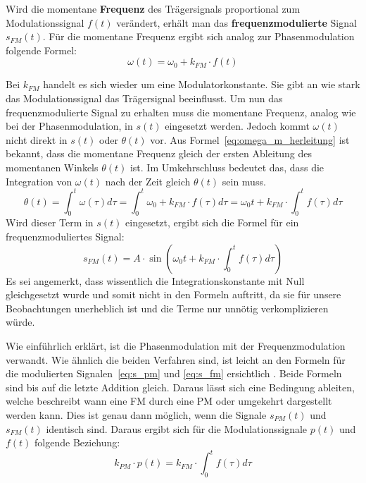 Wird die momentane \textbf{Frequenz} des Trägersignals proportional zum Modulationssignal \(f(t)\) verändert, erhält man das \textbf{frequenzmodulierte} Signal \(s_{FM}(t)\). \cite[S. 210]{lathi} Für die momentane Frequenz ergibt sich analog zur Phasenmodulation folgende Formel:
\begin{equation}
\omega(t)=\omega_0+k_{FM}\cdot f(t)
\label{eq:omega_m}
\end{equation}

Bei \(k_{FM}\) handelt es sich wieder um eine Modulatorkonstante. Sie gibt an wie stark das Modulationssignal das Trägersignal beeinflusst. Um nun das frequenzmodulierte Signal zu erhalten muss die momentane Frequenz, analog wie bei der Phasenmodulation, in \(s(t)\) eingesetzt werden. Jedoch kommt \(\omega(t)\) nicht direkt in \(s(t)\) oder \(\theta(t)\) vor. Aus Formel~\ref{eq:omega_m_herleitung} ist bekannt, dass die momentane Frequenz gleich der ersten Ableitung des momentanen Winkels \(\theta(t)\) ist. Im Umkehrschluss bedeutet das, dass die Integration von \(\omega(t)\) nach der Zeit gleich \(\theta(t)\) sein muss.
\begin{equation*}
\theta(t)=\int_0^t{\omega(\tau)} d\tau = \int_0^t{\omega_0 + k_{FM}\cdot f(\tau)} d\tau = \omega_0t + k_{FM} \cdot \int_0^t{f(\tau)} d\tau
\end{equation*}
Wird dieser Term in $s(t)$ eingesetzt, ergibt sich die Formel für ein frequenzmoduliertes Signal:
\begin{equation}
s_{FM}(t)=A\cdot\sin(\omega_0t + k_{FM} \cdot \int_0^t{f(\tau)} d\tau)
\label{eq:s_fm}
\end{equation}
Es sei angemerkt, dass wissentlich die Integrationskonstante mit Null gleichgesetzt wurde und somit nicht in den Formeln auftritt, da sie für unsere Beobachtungen unerheblich ist und die Terme nur unnötig verkomplizieren würde.

Wie einführlich erklärt, ist die Phasenmodulation mit der Frequenzmodulation verwandt. Wie ähnlich die beiden Verfahren sind, ist leicht an den Formeln für die modulierten Signalen~\ref{eq:s_pm} und \ref{eq:s_fm} ersichtlich . Beide Formeln sind bis auf die letzte Addition gleich. Daraus lässt sich eine Bedingung ableiten, welche beschreibt wann eine FM durch eine PM oder umgekehrt dargestellt werden kann. Dies ist genau dann möglich, wenn die Signale \(s_{PM}(t)\) und \(s_{FM}(t)\) identisch sind. Daraus ergibt sich für die Modulationssignale \(p(t)\) und \(f(t)\) folgende Beziehung:
\begin{equation}
k_{PM}\cdot p(t)=k_{FM} \cdot  \int_0^t{f(\tau)} d\tau
\end{equation}

